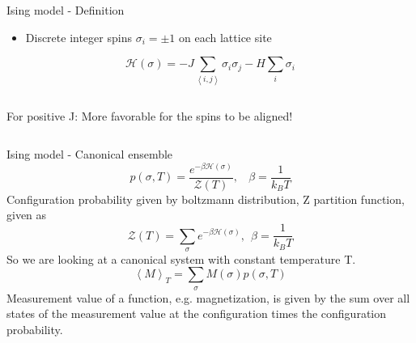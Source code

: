 \documentclass[handout]{beamer}
\begin{document}
\begin{frame}{Ising model - Definition}
\begin{itemize}
	 {Lattice with \(N\) sites.}
\item<2-> Discrete integer spins \( \sigma_i = \pm 1 \) on each lattice site
\end{itemize}
\pause[3]
\[ \mathscr{H}(\sigma) = -J \sum\limits_{\left< i, j \right>} \sigma_i \sigma_j - H \sum\limits_i \sigma_i \]

\begin{columns}[c]
	\pause
	\def\svgwidth{.5\textwidth}
	\centering
	
	\pause
	\def\svgwidth{.5\textwidth}
	\centering
	
		 {For positive J: More favorable for the spins to be aligned!}
\end{columns}
\end{frame}

\begin{frame}{Ising model - Canonical ensemble}
\pause
\[ p(\sigma, T) = \frac{e^{-\beta \mathscr{H}(\sigma)}}{\mathscr{Z}(T)}, \ \ \ \ \beta=\frac{1}{k_B T}\]
	 {Configuration probability given by boltzmann distribution, Z partition function, given as \[ \mathscr{Z}(T) = \sum_\sigma e^{-\beta \mathscr{H}(\sigma)},\ \ \beta = \frac{1}{k_B T} \]}
	 {So we are looking at a canonical system with constant temperature T.}
\pause
\[ \left< M \right>_T = \sum_\sigma M(\sigma)p(\sigma,T) \]
	 {Measurement value of a function, e.g. magnetization, is given by the sum over all states of the measurement value at the configuration times the configuration probability.}
\end{frame}
\end{document}
